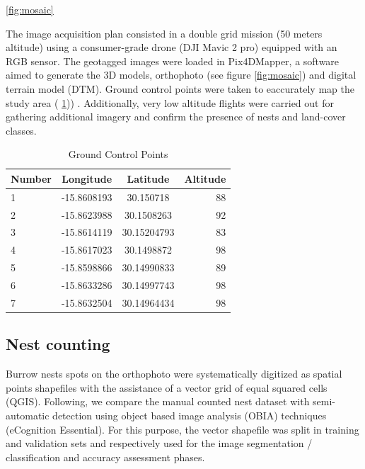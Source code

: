 \documentclass[12pt]{article}
\begin{document}
\ref{fig:mosaic}

The image acquisition plan consisted in a double grid mission (50 meters altitude) using a consumer-grade drone (DJI Mavic 2 pro) equipped with an RGB sensor. The geotagged images were loaded in Pix4DMapper, a software aimed to generate the 3D models, orthophoto (see figure \ref{fig:mosaic}) and digital terrain model (DTM). Ground control points were taken to eaccurately map the study area ( \ref{tab:table1})) . Additionally, very low altitude flights were carried out for gathering additional imagery and confirm the presence of nests and land-cover classes.

\begin{table}[h!]
	\begin{center}
		\caption{Ground Control Points}
		\label{tab:table1}
		\begin{tabular}{l|c|c|r}
			\textbf{Number} & \textbf{Longitude} & \textbf{Latitude}  & \textbf{Altitude}\\
			\hline
			1 & -15.8608193 & 30.150718 & 88\\
			2 & -15.8623988 & 30.1508263 & 92\\
			3 & -15.8614119 & 30.15204793 & 83\\
			4 & -15.8617023 & 30.1498872 & 98\\
			5 & -15.8598866 & 30.14990833 & 89\\
			6 & -15.8633286 & 30.14997743 & 98\\
			7 & -15.8632504 & 30.14964434 & 98\\
		\end{tabular}
	\end{center}
\end{table}


\subsection{Nest counting}

Burrow nests spots on the orthophoto were systematically digitized as spatial points shapefiles with the assistance of a  vector grid of equal squared cells (QGIS). Following, we compare the manual counted nest dataset with semi-automatic detection using object based image analysis (OBIA) techniques (eCognition Essential). For this purpose, the vector shapefile was split in training and validation sets and respectively used for the image segmentation / classification and accuracy assessment phases.
\end{document}
